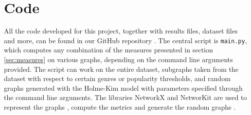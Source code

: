 \section{Code}

All the code developed for this project, together with results files, dataset files and more, can be found in our GitHub repository \cite{githubRepo}. The central script is \texttt{main.py}, which computes any combination of the measures presented in section \ref{sec:measures} on various graphs, depending on the command line arguments provided. The script can work on the entire dataset, subgraphs taken from the dataset with respect to certain genres or popularity thresholds, and random graphs generated with the Holme-Kim model \cite{Holme2002} with parameters specified through the command line arguments. The libraries NetworkX and NetworKit are used to represent the graphs \cite{NetworkX_Graph}, compute the metrics \cite{NetworkX_Centrality} \cite{NetworKit_local_clustering} \cite{NetworKit_globals_clustering} and generate the random graphs \cite{NetworkX_HolmeKim}.